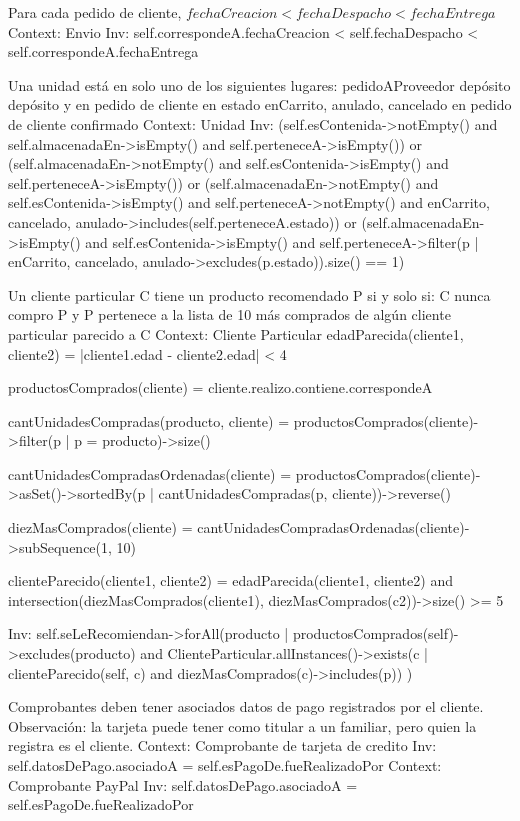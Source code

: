 \begin{listocl}
%
%
  \begin{itemocl}{Para cada pedido de cliente, $fechaCreacion < fechaDespacho < fechaEntrega$}
Context: Envio
Inv: self.correspondeA.fechaCreacion < self.fechaDespacho < self.correspondeA.fechaEntrega
  \end{itemocl}

%
%
  \begin{itemocl}{
      Una unidad está en solo uno de los siguientes lugares:
          pedidoAProveedor
          depósito
          depósito y en pedido de cliente en estado enCarrito, anulado, cancelado
          en pedido de cliente confirmado
    }
Context: Unidad
Inv:
(self.esContenida->notEmpty() and self.almacenadaEn->isEmpty() and self.perteneceA->isEmpty())
or
(self.almacenadaEn->notEmpty() and self.esContenida->isEmpty() and self.perteneceA->isEmpty())
or
(self.almacenadaEn->notEmpty() and self.esContenida->isEmpty() and self.perteneceA->notEmpty() and {enCarrito, cancelado, anulado}->includes(self.perteneceA.estado))
or
(self.almacenadaEn->isEmpty() and self.esContenida->isEmpty() and self.perteneceA->filter(p | {enCarrito, cancelado, anulado}->excludes(p.estado)).size() == 1)
  \end{itemocl}

%
%
  \begin{itemocl}{
      Un cliente particular C tiene un producto recomendado P si y solo si:
          C nunca compro P y
          P pertenece a la lista de 10 más comprados de algún cliente particular parecido a C
    }
Context: Cliente Particular
  edadParecida(cliente1, cliente2) = |cliente1.edad - cliente2.edad| < 4

  productosComprados(cliente) = cliente.realizo.contiene.correspondeA

  cantUnidadesCompradas(producto, cliente) = productosComprados(cliente)->filter(p | p = producto)->size()

  cantUnidadesCompradasOrdenadas(cliente) = productosComprados(cliente)->asSet()->sortedBy(p | cantUnidadesCompradas(p, cliente))->reverse()

  diezMasComprados(cliente) = cantUnidadesCompradasOrdenadas(cliente)->subSequence(1, 10)

  clienteParecido(cliente1, cliente2) = edadParecida(cliente1, cliente2) and intersection(diezMasComprados(cliente1), diezMasComprados(c2))->size() >= 5

  Inv: self.seLeRecomiendan->forAll(producto | productosComprados(self)->excludes(producto)
      and ClienteParticular.allInstances()->exists(c | clienteParecido(self, c) and diezMasComprados(c)->includes(p))
  )
  \end{itemocl}

%
%
  \begin{itemocl}{Comprobantes deben tener asociados datos de pago registrados por el cliente.
Observación: la tarjeta puede tener como titular a un familiar, pero quien la registra es el cliente.}
    Context: Comprobante de tarjeta de credito
    Inv: self.datosDePago.asociadoA = self.esPagoDe.fueRealizadoPor
    Context: Comprobante PayPal
    Inv: self.datosDePago.asociadoA = self.esPagoDe.fueRealizadoPor
  \end{itemocl}
\end{listocl}
